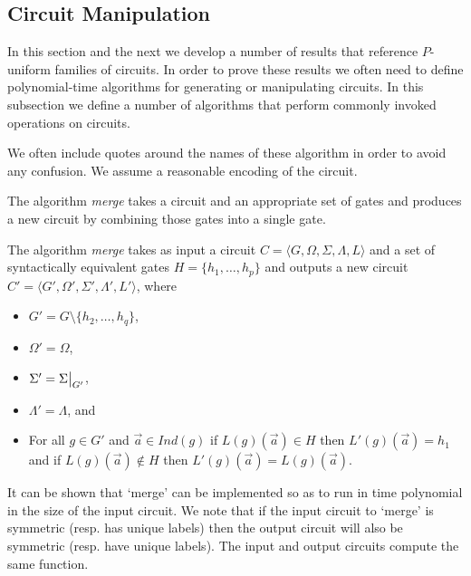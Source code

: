 \documentclass[../paper.tex]{subfiles}
\begin{document}
\subsection{Circuit Manipulation}
In this section and the next we develop a number of results that reference
$P$-uniform families of circuits. In order to prove these results we often need
to define polynomial-time algorithms for generating or manipulating circuits. In
this subsection we define a number of algorithms that perform commonly invoked
operations on circuits.

We often include quotes around the names of these algorithm in order to avoid
any confusion. We assume a reasonable encoding of the circuit.

The algorithm \emph{merge} takes a circuit and an appropriate set of gates and
produces a new circuit by combining those gates into a single gate.

\begin{definition}
  The algorithm \emph{merge} takes as input a circuit $C = \langle G, \Omega,
  \Sigma , \Lambda, L \rangle$ and a set of syntactically equivalent gates $H =
  \{h_1, \ldots , h_p\}$ and outputs a new circuit $C' = \langle G', \Omega',
  \Sigma', \Lambda', L' \rangle$, where
  \begin{itemize}
    \setlength\itemsep{0mm}
  \item $G' = G \setminus \{h_2, \ldots, h_q\}$,
  \item $\Omega' = \Omega$,
  \item $\Sigma' = \restr{\Sigma}{G'}$,
  \item $\Lambda' = \Lambda$, and
  \item For all $g \in G'$ and $\vec{a} \in Ind(g)$ if $L(g) (\vec{a}) \in H$
    then $L'(g)(\vec{a}) = h_1$ and if $L(g)(\vec{a}) \notin H$ then
    $L'(g)(\vec{a}) = L(g)(\vec{a})$.
  \end{itemize}
\end{definition}

It can be shown that `merge' can be implemented so as to run in time polynomial
in the size of the input circuit. We note that if the input circuit to `merge'
is symmetric (resp. has unique labels) then the output circuit will also be
symmetric (resp. have unique labels). The input and output circuits compute the
same function.

\end{document}
